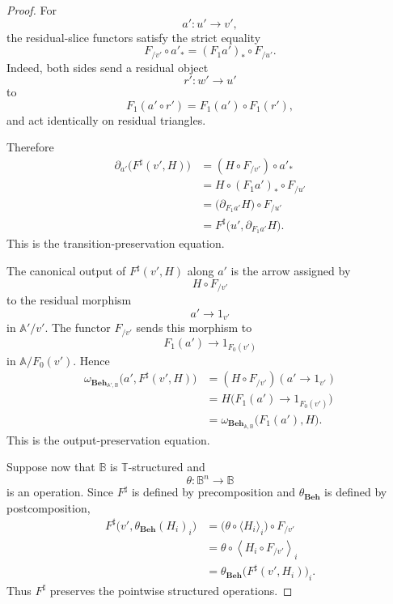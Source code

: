 \begin{proof}
    For
    \[
        a':u'\to v',
    \]
    the residual-slice functors satisfy the strict equality
    \[
        F_{/v'}\circ a'_*
        =
        (F_1a')_*\circ F_{/u'}.
    \]
    Indeed, both sides send a residual object
    \[
        r':w'\to u'
    \]
    to
    \[
        F_1(a'\circ r')
        =
        F_1(a')\circ F_1(r'),
    \]
    and act identically on residual triangles.

    Therefore
    \[
    \begin{aligned}
        \partial_{a'}
        \bigl(
            F^\sharp(v',H)
        \bigr)
        &=
        (H\circ F_{/v'})\circ a'_*
        \\
        &=
        H\circ(F_1a')_*\circ F_{/u'}
        \\
        &=
        \bigl(
            \partial_{F_1a'}H
        \bigr)
        \circ F_{/u'}
        \\
        &=
        F^\sharp
        \bigl(
            u',
            \partial_{F_1a'}H
        \bigr).
    \end{aligned}
    \]
    This is the transition-preservation equation.

    The canonical output of \(F^\sharp(v',H)\) along \(a'\) is the arrow
    assigned by
    \[
        H\circ F_{/v'}
    \]
    to the residual morphism
    \[
        a'\to1_{v'}
    \]
    in \(\mathbb A'/v'\). The functor \(F_{/v'}\) sends this morphism to
    \[
        F_1(a')\to1_{F_0(v')}
    \]
    in \(\mathbb A/F_0(v')\). Hence
    \[
    \begin{aligned}
        \omega_{\mathbf{Beh}_{\mathbb A',\mathbb B}}
        \bigl(
            a',
            F^\sharp(v',H)
        \bigr)
        &=
        (H\circ F_{/v'})
        (a'\to1_{v'})
        \\
        &=
        H
        \bigl(
            F_1(a')\to1_{F_0(v')}
        \bigr)
        \\
        &=
        \omega_{\mathbf{Beh}_{\mathbb A,\mathbb B}}
        \bigl(
            F_1(a'),
            H
        \bigr).
    \end{aligned}
    \]
    This is the output-preservation equation.

    Suppose now that \(\mathbb B\) is \(\mathbb T\)-structured and
    \[
        \theta:\mathbb B^n\to\mathbb B
    \]
    is an operation. Since \(F^\sharp\) is defined by precomposition and
    \(\theta_{\mathbf{Beh}}\) is defined by postcomposition,
    \[
    \begin{aligned}
        F^\sharp
        \bigl(
            v',
            \theta_{\mathbf{Beh}}(H_i)_i
        \bigr)
        &=
        \bigl(
            \theta\circ\langle H_i\rangle_i
        \bigr)
        \circ F_{/v'}
        \\
        &=
        \theta
        \circ
        \left\langle
            H_i\circ F_{/v'}
        \right\rangle_i
        \\
        &=
        \theta_{\mathbf{Beh}}
        \bigl(
            F^\sharp(v',H_i)
        \bigr)_i.
    \end{aligned}
    \]
    Thus \(F^\sharp\) preserves the pointwise structured operations.
\end{proof}

